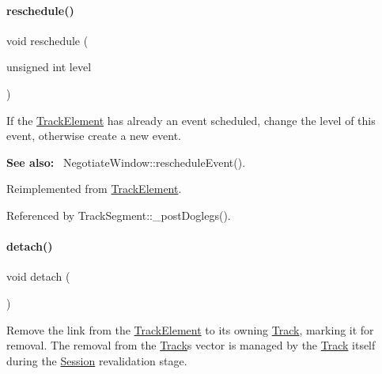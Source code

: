 \mbox{\label{classKite_1_1TrackSegment_a0ffe603ec7d46f21f5e56ccbe84c03fb}} 
\paragraph{\texorpdfstring{reschedule()}{reschedule()}}
{\footnotesize\ttfamily void reschedule (\begin{DoxyParamCaption}\item[{unsigned int}]{level }\end{DoxyParamCaption})\hspace{0.3cm}{\ttfamily [virtual]}}

If the \mbox{\hyperlink{classKite_1_1TrackElement}{Track\+Element}} has already an event scheduled, change the level of this event, otherwise create a new event.

{\bfseries See also\+:}~ Negotiate\+Window\+::reschedule\+Event(). 

Reimplemented from \mbox{\hyperlink{classKite_1_1TrackElement_a0ffe603ec7d46f21f5e56ccbe84c03fb}{Track\+Element}}.



Referenced by Track\+Segment\+::\+\_\+post\+Doglegs().

\mbox{\label{classKite_1_1TrackSegment_ac295bade8aee589f6718dfa79edc2a34}} 
\paragraph{\texorpdfstring{detach()}{detach()}}
{\footnotesize\ttfamily void detach (\begin{DoxyParamCaption}{ }\end{DoxyParamCaption})\hspace{0.3cm}{\ttfamily [virtual]}}

Remove the link from the \mbox{\hyperlink{classKite_1_1TrackElement}{Track\+Element}} to it\textquotesingle{}s owning \mbox{\hyperlink{classKite_1_1Track}{Track}}, marking it for removal. The removal from the \mbox{\hyperlink{classKite_1_1Track}{Track}}\textquotesingle{}s vector is managed by the \mbox{\hyperlink{classKite_1_1Track}{Track}} itself during the \mbox{\hyperlink{classKite_1_1Session}{Session}} revalidation stage. 

